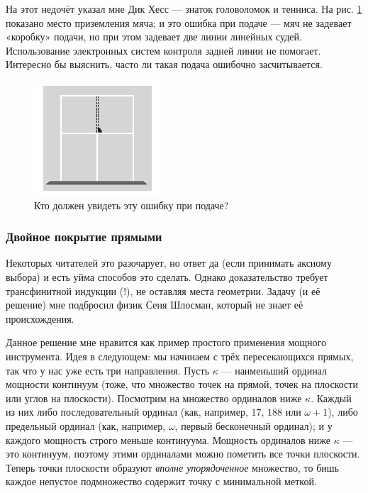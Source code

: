 На этот недочёт указал мне Дик Хесс --- знаток головоломок и тенниса.
На рис. \ref{pic:tenis} показано место приземления мяча; и это ошибка при подаче --- мяч не задевает «коробку» подачи, но при этом задевает две линии линейных судей. 
Использование электронных систем контроля задней линии не помогает.
Интересно бы выяснить, часто ли такая подача ошибочно засчитывается.

\begin{figure}[ht!]
\centering
\includegraphics[scale=1]{pics/tenis}
\caption{Кто должен увидеть эту ошибку при подаче?}
\label{pic:tenis}
\end{figure}


\subsubsection*{Двойное покрытие прямыми}


Некоторых читателей это разочарует, но ответ да (если принимать аксиому выбора) и есть уйма способов это сделать. %
Однако доказательство требует трансфинитной индукции (!), не оставляя места геометрии.
Задачу (и её решение) мне подбросил физик Сеня Шлосман, который не знает её происхождения.

Данное решение мне нравится как пример простого применения мощного инструмента.
Идея в следующем: мы начинаем с трёх пересекающихся прямых, так что у нас уже есть три направления.
Пусть $\kappa$ --- наименьший ординал мощности континуум (тоже, что множество точек на прямой, точек на плоскости или углов на плоскости).
Посмотрим на множество ординалов ниже $\kappa$.
Каждый из них либо последовательный ординал (как, например, $17$, $188$ или $\omega + 1$), либо предельный ординал (как, например, $\omega$, первый бесконечный ординал);
и у каждого мощность строго меньше континуума.
Мощность ординалов ниже $\kappa$ --- это континуум, поэтому этими ординалами можно пометить все точки плоскости.
Теперь точки плоскости образуют \emph{вполне упорядоченное} множество, то бишь каждое непустое подмножество содержит точку с минимальной меткой.


